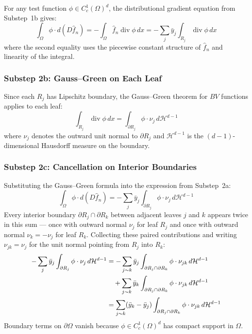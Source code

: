 \documentclass[12pt]{article}
\newcommand{\fn}{\hat{f}_n}
\begin{document}
	For any test function $\phi \in C_c^1(\Omega)^d$, the distributional
	gradient equation from Substep~1b gives:
	\begin{equation}
		\int_\Omega \phi \cdot d(D\fn)
		= -\int_\Omega \fn \operatorname{div} \phi \, dx
		= -\sum_j \bar{y}_j \int_{R_j} \operatorname{div} \phi \, dx
	\end{equation}
	where the second equality uses the piecewise constant structure of $\fn$ and
	linearity of the integral.
	
	\subsubsection*{Substep 2b: Gauss--Green on Each Leaf}
	
	Since each $R_j$ has Lipschitz boundary, the Gauss--Green theorem for $BV$
	functions \citep[Theorem~5.16]{evans2015measure} applies to each leaf:
	\begin{equation}
		\int_{R_j} \operatorname{div} \phi \, dx
		= \int_{\partial R_j} \phi \cdot \nu_j \, d\mathcal{H}^{d-1}
	\end{equation}
	where $\nu_j$ denotes the outward unit normal to $\partial R_j$ and
	$\mathcal{H}^{d-1}$ is the $(d-1)$-dimensional Hausdorff measure on the
	boundary.
	
	\subsubsection*{Substep 2c: Cancellation on Interior Boundaries}
	
	Substituting the Gauss--Green formula into the expression from Substep~2a:
	\begin{equation}
		\int_\Omega \phi \cdot d(D\fn)
		= -\sum_j \bar{y}_j \int_{\partial R_j} \phi \cdot \nu_j \, d\mathcal{H}^{d-1}
	\end{equation}
	Every interior boundary $\partial R_j \cap \partial R_k$ between adjacent
	leaves $j$ and $k$ appears twice in this sum --- once with outward normal
	$\nu_j$ for leaf $R_j$ and once with outward normal $\nu_k = -\nu_j$ for
	leaf $R_k$. Collecting these paired contributions and writing $\nu_{jk} =
	\nu_j$ for the unit normal pointing from $R_j$ into $R_k$:
	\begin{align}
		-\sum_j \bar{y}_j \int_{\partial R_j} \phi \cdot \nu_j \, d\mathcal{H}^{d-1}
		&= -\sum_{j \sim k} \bar{y}_j \int_{\partial R_j \cap \partial R_k}
		\phi \cdot \nu_{jk} \, d\mathcal{H}^{d-1} \notag \\
		&\quad + \sum_{j \sim k} \bar{y}_k \int_{\partial R_j \cap \partial R_k}
		\phi \cdot \nu_{jk} \, d\mathcal{H}^{d-1} \notag \\
		&= \sum_{j \sim k} (\bar{y}_k - \bar{y}_j)
		\int_{\partial R_j \cap \partial R_k} \phi \cdot \nu_{jk}
		\, d\mathcal{H}^{d-1}
	\end{align}
	Boundary terms on $\partial\Omega$ vanish because $\phi \in C_c^1(\Omega)^d$
	has compact support in $\Omega$.
	
\end{document}
